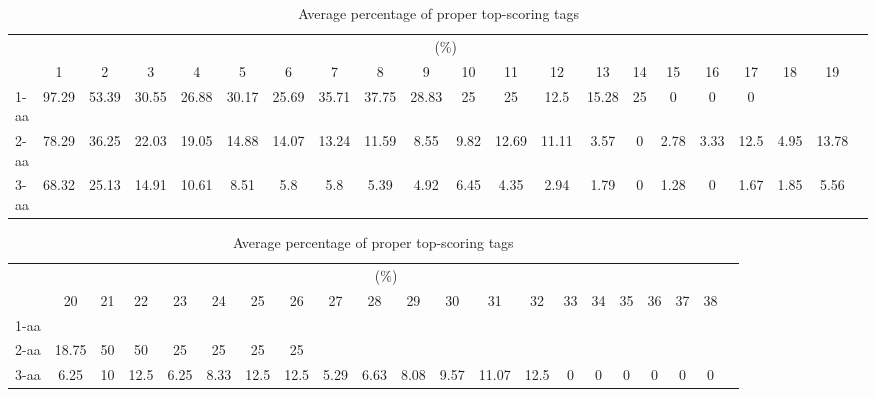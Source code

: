 \begin{table}[h]\tiny
\vspace{3mm}
{\centering
\begin{center}
\begin{tabular}{|l|c|c|c|c|c|c|c|c|c|c|c|c|c|c|c|c|c|c|c|c|}
  \hline
  & \multicolumn{ 19 }{|c|}{(\%)} \\
  \cline{2- 20}
    & 1 & 2 & 3 & 4 & 5 & 6 & 7 & 8 & 9 & 10 & 11 & 12 & 13 & 14 & 15 & 16 & 17 & 18 & 19\\
  \hline
1-aa  & 97.29 & 53.39 & 30.55 & 26.88 & 30.17 & 25.69 & 35.71 & 37.75 & 28.83 & 25 & 25 & 12.5 & 15.28 & 25 & 0 & 0 & 0 &  & \\
2-aa  & 78.29 & 36.25 & 22.03 & 19.05 & 14.88 & 14.07 & 13.24 & 11.59 & 8.55 & 9.82 & 12.69 & 11.11 & 3.57 & 0 & 2.78 & 3.33 & 12.5 & 4.95 & 13.78\\
3-aa  & 68.32 & 25.13 & 14.91 & 10.61 & 8.51 & 5.8 & 5.8 & 5.39 & 4.92 & 6.45 & 4.35 & 2.94 & 1.79 & 0 & 1.28 & 0 & 1.67 & 1.85 & 5.56\\
 \hline
\end{tabular}
\end{center}
\par}
\centering
\caption{ Average percentage of proper top-scoring tags}
\vspace{3mm}
\label{table:k}
\end{table}
\begin{table}[h]\tiny
\vspace{3mm}
{\centering
\begin{center}
\begin{tabular}{|l|c|c|c|c|c|c|c|c|c|c|c|c|c|c|c|c|c|c|c|c|}
  \hline
  & \multicolumn{ 19 }{|c|}{(\%)} \\
  \cline{2- 20}
    & 20 & 21 & 22 & 23 & 24 & 25 & 26 & 27 & 28 & 29 & 30 & 31 & 32 & 33 & 34 & 35 & 36 & 37 & 38\\
  \hline
1-aa  &  &  &  &  &  &  &  &  &  &  &  &  &  &  &  &  &  &  & \\
2-aa  & 18.75 & 50 & 50 & 25 & 25 & 25 & 25 &  &  &  &  &  &  &  &  &  &  &  & \\
3-aa  & 6.25 & 10 & 12.5 & 6.25 & 8.33 & 12.5 & 12.5 & 5.29 & 6.63 & 8.08 & 9.57 & 11.07 & 12.5 & 0 & 0 & 0 & 0 & 0 & 0\\
 \hline
\end{tabular}
\end{center}
\par}
\centering
\caption{ Average percentage of proper top-scoring tags}
\vspace{3mm}
\label{table:k}
\end{table}
